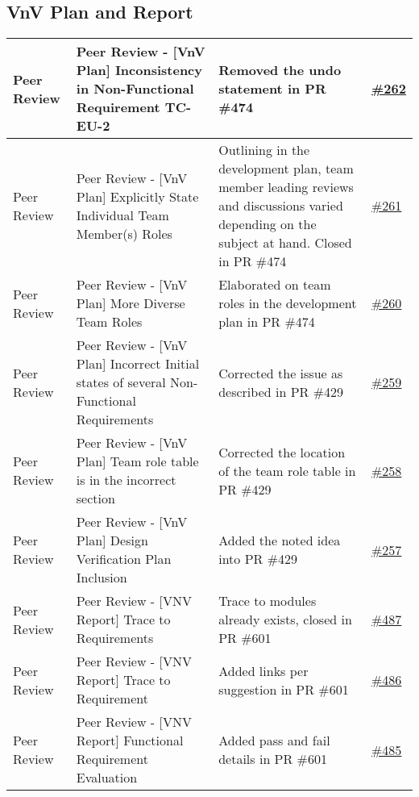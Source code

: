 \documentclass{article}
\begin{document}
\subsection{VnV Plan and Report}
\begin{longtable}{|m{3cm}|m{3cm}|m{5cm}|m{1cm}|}
  \hline
   Peer Review & Peer Review - [VnV Plan] Inconsistency in Non-Functional Requirement TC-EU-2 & Removed the undo statement in PR \#474 
   & \href{https://github.com/Spitgranger/SyncMaster/pull/262}{\#262}\\
   \hline
   Peer Review & Peer Review - [VnV Plan] Explicitly State Individual Team Member(s) Roles & Outlining in the development plan, team member leading reviews 
   and discussions varied depending on the subject at hand. Closed in PR \#474 & \href{https://github.com/Spitgranger/SyncMaster/pull/261}{\#261}\\
   \hline
   Peer Review & Peer Review - [VnV Plan] More Diverse Team Roles & Elaborated on team roles in the development plan in PR \#474 & \href{https://github.com/Spitgranger/SyncMaster/pull/260}{\#260}\\
   \hline
   Peer Review & Peer Review - [VnV Plan] Incorrect Initial states of several Non-Functional Requirements & Corrected the issue as described
   in PR \#429 & \href{https://github.com/Spitgranger/SyncMaster/pull/259}{\#259}\\
   \hline
   Peer Review & Peer Review - [VnV Plan] Team role table is in the incorrect section & Corrected the location of the team role 
   table in PR \#429 & \href{https://github.com/Spitgranger/SyncMaster/pull/258}{\#258}\\
   \hline
   Peer Review & Peer Review - [VnV Plan] Design Verification Plan Inclusion & Added the noted idea into PR \#429 & \href{https://github.com/Spitgranger/SyncMaster/pull/257}{\#257}\\
   \hline
   Peer Review & Peer Review - [VNV Report] Trace to Requirements & Trace to modules already exists, closed in PR \#601 & \href{https://github.com/Spitgranger/SyncMaster/pull/487}{\#487}\\
  \hline
  Peer Review & Peer Review - [VNV Report] Trace to Requirement & Added links per suggestion in PR \#601 & \href{https://github.com/Spitgranger/SyncMaster/pull/486}{\#486}\\
  \hline
  Peer Review & Peer Review - [VNV Report] Functional Requirement Evaluation & Added pass and fail details in PR \#601 & \href{https://github.com/Spitgranger/SyncMaster/pull/485}{\#485}\\

\end{longtable}
\end{document}
